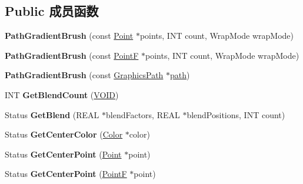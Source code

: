 \subsection*{Public 成员函数}
\begin{DoxyCompactItemize}
\item 
\mbox{\label{class_path_gradient_brush_a6f431b9f3e98e70711b1bffbf6ddbd47}} 
{\bfseries Path\+Gradient\+Brush} (const \hyperlink{struct_point}{Point} $\ast$points, I\+NT count, Wrap\+Mode wrap\+Mode)
\item 
\mbox{\label{class_path_gradient_brush_a5ff9e79ecbadb9f550ef6bb34ddbb771}} 
{\bfseries Path\+Gradient\+Brush} (const \hyperlink{struct_point_f}{PointF} $\ast$points, I\+NT count, Wrap\+Mode wrap\+Mode)
\item 
\mbox{\label{class_path_gradient_brush_a9e76687570dde5379859c97fe292eb57}} 
{\bfseries Path\+Gradient\+Brush} (const \hyperlink{class_graphics_path}{Graphics\+Path} $\ast$\hyperlink{structpath}{path})
\item 
\mbox{\label{class_path_gradient_brush_a1d675166a810822835b7bf4ccbc43d91}} 
I\+NT {\bfseries Get\+Blend\+Count} (\hyperlink{interfacevoid}{V\+O\+ID})
\item 
\mbox{\label{class_path_gradient_brush_ad9786c0f6c8601b1d046a0b4acde4ed9}} 
Status {\bfseries Get\+Blend} (R\+E\+AL $\ast$blend\+Factors, R\+E\+AL $\ast$blend\+Positions, I\+NT count)
\item 
\mbox{\label{class_path_gradient_brush_abdc3b4f8200ab3125ab51510a2303a48}} 
Status {\bfseries Get\+Center\+Color} (\hyperlink{struct_color}{Color} $\ast$color)
\item 
\mbox{\label{class_path_gradient_brush_a0ea20f21590ee03d4095d26e4216665f}} 
Status {\bfseries Get\+Center\+Point} (\hyperlink{struct_point}{Point} $\ast$point)
\item 
\mbox{\label{class_path_gradient_brush_afc7cfa6add8623530149d032bda858c5}} 
Status {\bfseries Get\+Center\+Point} (\hyperlink{struct_point_f}{PointF} $\ast$point)

\end{DoxyCompactItemize}
